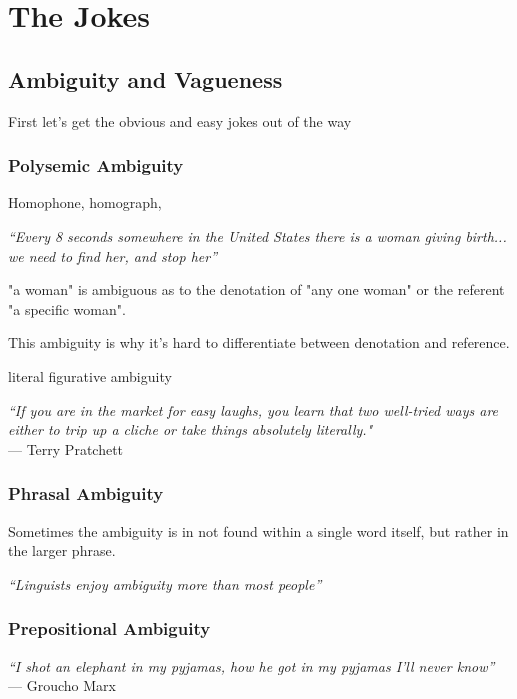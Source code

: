 \chapter{The Jokes}
\section{Ambiguity and Vagueness}
First let's get the obvious and easy jokes out of the way

\subsection{Polysemic Ambiguity}

Homophone, homograph, 


\textit{``Every 8 seconds somewhere in the United States there is a woman giving birth... we need to find her, and stop her''}

"a woman" is ambiguous as to the denotation of "any one woman" or the referent "a specific woman". 

This ambiguity is why it's hard to differentiate between denotation and reference.

literal figurative ambiguity

\begin{center}
\textit{``If you are in the market for easy laughs, you learn that two well-tried ways are either to trip up a cliche or take things absolutely literally."}
\\ --- Terry Pratchett
\end{center}

\subsection{Phrasal Ambiguity}
Sometimes the ambiguity is in not found within a single word itself, but rather in the larger phrase.

\begin{center}
    \textit{``Linguists enjoy ambiguity more than most people''}
\end{center} 

\subsection{Prepositional Ambiguity}

\begin{center}
	\textit{``I shot an elephant in my pyjamas, how he got in my pyjamas I'll never know''}
	--- Groucho Marx
\end{center} 

